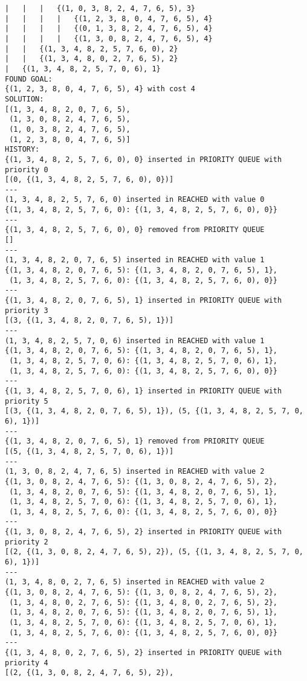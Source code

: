 \documentclass{article}
\begin{document}
\begin{verbatim}
|   |   |   {(1, 0, 3, 8, 2, 4, 7, 6, 5), 3}
|   |   |   |   {(1, 2, 3, 8, 0, 4, 7, 6, 5), 4}
|   |   |   |   {(0, 1, 3, 8, 2, 4, 7, 6, 5), 4}
|   |   |   |   {(1, 3, 0, 8, 2, 4, 7, 6, 5), 4}
|   |   {(1, 3, 4, 8, 2, 5, 7, 6, 0), 2}
|   |   {(1, 3, 4, 8, 0, 2, 7, 6, 5), 2}
|   {(1, 3, 4, 8, 2, 5, 7, 0, 6), 1}
FOUND GOAL:
{(1, 2, 3, 8, 0, 4, 7, 6, 5), 4} with cost 4
SOLUTION:
[(1, 3, 4, 8, 2, 0, 7, 6, 5),
 (1, 3, 0, 8, 2, 4, 7, 6, 5),
 (1, 0, 3, 8, 2, 4, 7, 6, 5),
 (1, 2, 3, 8, 0, 4, 7, 6, 5)]
HISTORY:
{(1, 3, 4, 8, 2, 5, 7, 6, 0), 0} inserted in PRIORITY QUEUE with priority 0
[(0, {(1, 3, 4, 8, 2, 5, 7, 6, 0), 0})]
---
(1, 3, 4, 8, 2, 5, 7, 6, 0) inserted in REACHED with value 0
{(1, 3, 4, 8, 2, 5, 7, 6, 0): {(1, 3, 4, 8, 2, 5, 7, 6, 0), 0}}
---
{(1, 3, 4, 8, 2, 5, 7, 6, 0), 0} removed from PRIORITY QUEUE
[]
---
(1, 3, 4, 8, 2, 0, 7, 6, 5) inserted in REACHED with value 1
{(1, 3, 4, 8, 2, 0, 7, 6, 5): {(1, 3, 4, 8, 2, 0, 7, 6, 5), 1},
 (1, 3, 4, 8, 2, 5, 7, 6, 0): {(1, 3, 4, 8, 2, 5, 7, 6, 0), 0}}
---
{(1, 3, 4, 8, 2, 0, 7, 6, 5), 1} inserted in PRIORITY QUEUE with priority 3
[(3, {(1, 3, 4, 8, 2, 0, 7, 6, 5), 1})]
---
(1, 3, 4, 8, 2, 5, 7, 0, 6) inserted in REACHED with value 1
{(1, 3, 4, 8, 2, 0, 7, 6, 5): {(1, 3, 4, 8, 2, 0, 7, 6, 5), 1},
 (1, 3, 4, 8, 2, 5, 7, 0, 6): {(1, 3, 4, 8, 2, 5, 7, 0, 6), 1},
 (1, 3, 4, 8, 2, 5, 7, 6, 0): {(1, 3, 4, 8, 2, 5, 7, 6, 0), 0}}
---
{(1, 3, 4, 8, 2, 5, 7, 0, 6), 1} inserted in PRIORITY QUEUE with priority 5
[(3, {(1, 3, 4, 8, 2, 0, 7, 6, 5), 1}), (5, {(1, 3, 4, 8, 2, 5, 7, 0, 6), 1})]
---
{(1, 3, 4, 8, 2, 0, 7, 6, 5), 1} removed from PRIORITY QUEUE
[(5, {(1, 3, 4, 8, 2, 5, 7, 0, 6), 1})]
---
(1, 3, 0, 8, 2, 4, 7, 6, 5) inserted in REACHED with value 2
{(1, 3, 0, 8, 2, 4, 7, 6, 5): {(1, 3, 0, 8, 2, 4, 7, 6, 5), 2},
 (1, 3, 4, 8, 2, 0, 7, 6, 5): {(1, 3, 4, 8, 2, 0, 7, 6, 5), 1},
 (1, 3, 4, 8, 2, 5, 7, 0, 6): {(1, 3, 4, 8, 2, 5, 7, 0, 6), 1},
 (1, 3, 4, 8, 2, 5, 7, 6, 0): {(1, 3, 4, 8, 2, 5, 7, 6, 0), 0}}
---
{(1, 3, 0, 8, 2, 4, 7, 6, 5), 2} inserted in PRIORITY QUEUE with priority 2
[(2, {(1, 3, 0, 8, 2, 4, 7, 6, 5), 2}), (5, {(1, 3, 4, 8, 2, 5, 7, 0, 6), 1})]
---
(1, 3, 4, 8, 0, 2, 7, 6, 5) inserted in REACHED with value 2
{(1, 3, 0, 8, 2, 4, 7, 6, 5): {(1, 3, 0, 8, 2, 4, 7, 6, 5), 2},
 (1, 3, 4, 8, 0, 2, 7, 6, 5): {(1, 3, 4, 8, 0, 2, 7, 6, 5), 2},
 (1, 3, 4, 8, 2, 0, 7, 6, 5): {(1, 3, 4, 8, 2, 0, 7, 6, 5), 1},
 (1, 3, 4, 8, 2, 5, 7, 0, 6): {(1, 3, 4, 8, 2, 5, 7, 0, 6), 1},
 (1, 3, 4, 8, 2, 5, 7, 6, 0): {(1, 3, 4, 8, 2, 5, 7, 6, 0), 0}}
---
{(1, 3, 4, 8, 0, 2, 7, 6, 5), 2} inserted in PRIORITY QUEUE with priority 4
[(2, {(1, 3, 0, 8, 2, 4, 7, 6, 5), 2}),

\end{verbatim}
\end{document}
